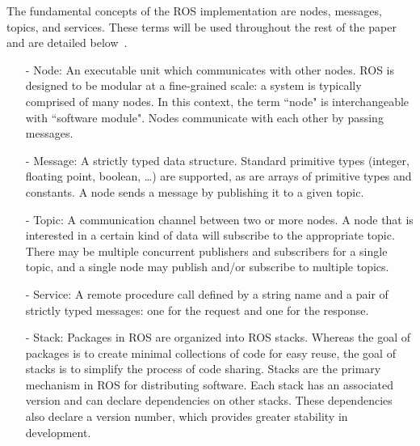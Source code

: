 The fundamental concepts of the ROS implementation are
nodes, messages, topics, and services. These terms will be used throughout the rest of the paper and are detailed below~\cite{QUIGLEY.ICRA.2009}.
\begin{itemize}
\item[-] Node: An executable unit which communicates with other nodes. ROS is
designed to be modular at a fine-grained scale: a system
is typically comprised of many nodes. In this context, the
term ``node" is interchangeable with ``software module". Nodes communicate with each other by passing messages.
\item[-] Message: A strictly typed data structure. Standard
primitive types (integer, floating point, boolean, \ldots) are
supported, as are arrays of primitive types and constants. A node sends a message by publishing it to a given topic.
\item[-] Topic: A communication channel between two or more
nodes. A node that is interested in a certain kind of data will subscribe
to the appropriate topic. There may be multiple concurrent
publishers and subscribers for a single topic, and a single
node may publish and/or subscribe to multiple topics.
\item[-] Service: A remote procedure call defined by a string name and a pair
of strictly typed messages: one for the request and one for
the response.
\item[-] Stack: Packages in ROS are organized into ROS stacks. Whereas the goal of packages is to create minimal collections of code for easy reuse, the goal of stacks is to simplify the process of code sharing. Stacks are the primary mechanism in ROS for distributing software. Each stack has an associated version and can declare dependencies on other stacks. These dependencies also declare a version number, which provides greater stability in development.
\end{itemize} 